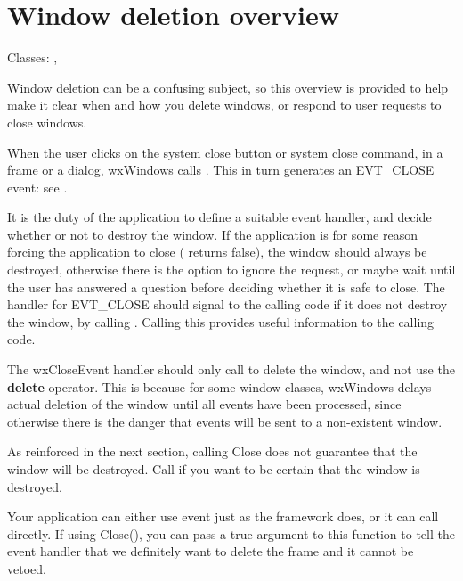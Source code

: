 \section{Window deletion overview}\label{windowdeletionoverview}

Classes: , 

Window deletion can be a confusing subject, so this overview is provided
to help make it clear when and how you delete windows, or respond to user requests
to close windows.


When the user clicks on the system close button or system close command,
in a frame or a dialog, wxWindows calls . This
in turn generates an EVT\_CLOSE event: see .

It is the duty of the application to define a suitable event handler, and
decide whether or not to destroy the window.
If the application is for some reason forcing the application to close
( returns false), the window should always be destroyed, otherwise there is the option to
ignore the request, or maybe wait until the user has answered a question
before deciding whether it is safe to close. The handler for EVT\_CLOSE should
signal to the calling code if it does not destroy the window, by calling 
. Calling this provides useful information
to the calling code.

The wxCloseEvent handler should only call  to
delete the window, and not use the {\bf delete} operator. This is because
for some window classes, wxWindows delays actual deletion of the window until all events have been processed,
since otherwise there is the danger that events will be sent to a non-existent window.

As reinforced in the next section, calling Close does not guarantee that the window
will be destroyed. Call  if you want to be
certain that the window is destroyed.


Your application can either use  event just as
the framework does, or it can call  directly.
If using Close(), you can pass a true argument to this function to tell the event handler
that we definitely want to delete the frame and it cannot be vetoed.

